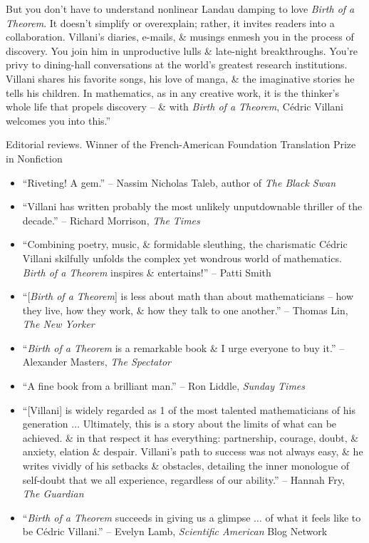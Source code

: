 \documentclass{article}
\begin{document}
\begin{enumerate}
	But you don't have to understand nonlinear Landau damping to love {\it Birth of a Theorem}. It doesn't simplify or overexplain; rather, it invites readers into a collaboration. {\sc Villani}'s diaries, e-mails, \& musings enmesh you in the process of discovery. You join him in unproductive lulls \& late-night breakthroughs. You're privy to dining-hall conversations at the world's greatest research institutions. {\sc Villani} shares his favorite songs, his love of manga, \& the imaginative stories he tells his children. In mathematics, as in any creative work, it is the thinker's whole life that propels discovery -- \& with {\it Birth of a Theorem}, {\sc C\'edric Villani} welcomes you into this.''
	
	{\sf Editorial reviews.} Winner of the French-American Foundation Translation Prize in Nonfiction
	\begin{itemize}
		\item ``Riveting! A gem.'' -- {\sc Nassim Nicholas Taleb}, author of {\it The Black Swan}
		\item ``{\sc Villani} has written probably the most unlikely unputdownable thriller of the decade.'' -- {\sc Richard Morrison}, {\it The Times}
		\item ``Combining poetry, music, \& formidable sleuthing, the charismatic {\sc C\'edric Villani} skilfully unfolds the complex yet wondrous world of mathematics. {\it Birth of a Theorem} inspires \& entertains!'' -- {\sc Patti Smith}
		\item ``[{\it Birth of a Theorem}] is less about math than about mathematicians -- how they live, how they work, \& how they talk to one another.'' -- {\sc Thomas Lin}, {\it The New Yorker}
		\item ``{\it Birth of a Theorem} is a remarkable book \& I urge everyone to buy it.'' -- {\sc Alexander Masters}, {\it The Spectator}
		\item ``A fine book from a brilliant man.'' -- {\sc Ron Liddle}, {\it Sunday Times}
		\item ``[{\sc Villani}] is widely regarded as 1 of the most talented mathematicians of his generation $\ldots$ Ultimately, this is a story about the limits of what can be achieved. \& in that respect it has everything: partnership, courage, doubt, \& anxiety, elation \& despair. {\sc Villani}'s path to success was not always easy, \& he writes vividly of his setbacks \& obstacles, detailing the inner monologue of self-doubt that we all experience, regardless of our ability.'' -- {\sc Hannah Fry}, {\it The Guardian}
		\item ``{\it Birth of a Theorem} succeeds in giving us a glimpse $\ldots$ of what it feels like to be {\sc C\'edric Villani}.'' -- {\sc Evelyn Lamb}, {\it Scientific American} Blog Network

\end{itemize}
\end{enumerate}
\end{document}
